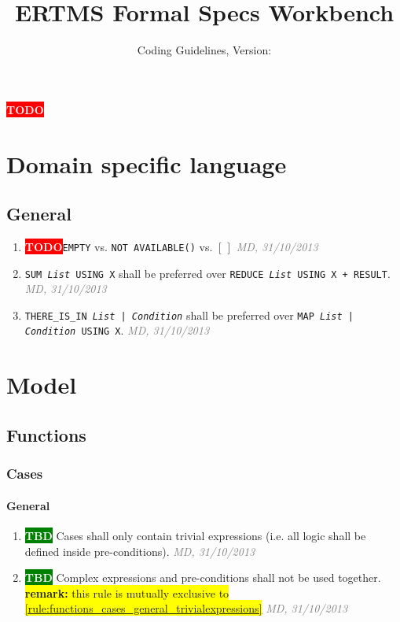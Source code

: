 \documentclass[a4paper, oneside]{scrreprt}
\newcommand{\docTitle}{ERTMS Formal Specs Workbench}
\newcommand{\docSubTitle}{Coding Guidelines}
\let\emph\textsl
\newcommand{\code}[1]{\texttt{#1}}
\newcommand{\TODO}{\colorbox{red}{\textcolor{white}{\textbf{\textsf{TODO}}}}\xspace}
\newcommand{\TBD}{\colorbox{green}{\textcolor{white}{\textbf{\textsf{TBD}}}}\xspace}
\newcommand{\remark}[1]{\mbox{}\newline\colorbox{yellow}{\textsf{\textbf{remark:} #1}}\xspace}
\newcommand{\ruleauthor}[2]{\mbox{}\newline\mbox{}\hfill{\footnotesize\textcolor{gray}{\emph{#1, #2}}}\xspace}
\begin{document}
\title{\docTitle}
\subtitle{\docSubTitle, Version: \vhCurrentVersion}
\date{\vhCurrentDate}
\author{\vhListAllAuthorsLongWithAbbrev}
\maketitle


\begin{versionhistory}
\end{versionhistory}

\newpage
\tableofcontents
\newpage

\TODO

\chapter{Domain specific language}

\section{General}
\begin{enumerate}
\item \TODO \code{EMPTY} vs. \code{NOT AVAILABLE()} vs. \code{$[\,]$} \ruleauthor{MD}{31/10/2013}
\item \code{SUM \emph{List} USING X} shall be preferred over \code{REDUCE \emph{List} USING X + RESULT}. \ruleauthor{MD}{31/10/2013}
\item \code{THERE_IS_IN \emph{List} | \emph{Condition}} shall be preferred over \code{MAP \emph{List} | \emph{Condition} USING X}. \ruleauthor{MD}{31/10/2013}
\end{enumerate}


\chapter{Model}

\section{Functions}
\subsection{Cases}

\subsubsection{General}
\begin{enumerate}
\item \label{rule:functions_cases_general_trivialexpressions}\TBD Cases shall only contain trivial expressions (i.e. all logic shall be defined inside pre-conditions). \ruleauthor{MD}{31/10/2013}
\item \TBD Complex expressions and pre-conditions shall not be used together. \remark{this rule is mutually exclusive to \ref{rule:functions_cases_general_trivialexpressions}} \ruleauthor{MD}{31/10/2013}
\end{enumerate}
\end{document}
